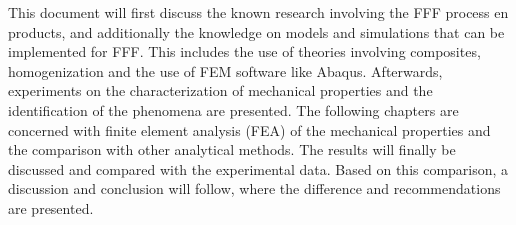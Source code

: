 This document will first discuss the known research involving the FFF process en products, and additionally the knowledge on models and simulations that can be implemented for FFF. This includes the use of theories involving composites, homogenization and the use of FEM software like Abaqus. Afterwards, experiments on the characterization of mechanical properties and the identification of the phenomena are presented. The following chapters are concerned with finite element analysis (FEA) of the mechanical properties and the comparison with other analytical methods. The results will finally be discussed and compared with the experimental data. Based on this comparison, a discussion and conclusion will follow, where the difference and recommendations are presented. 









